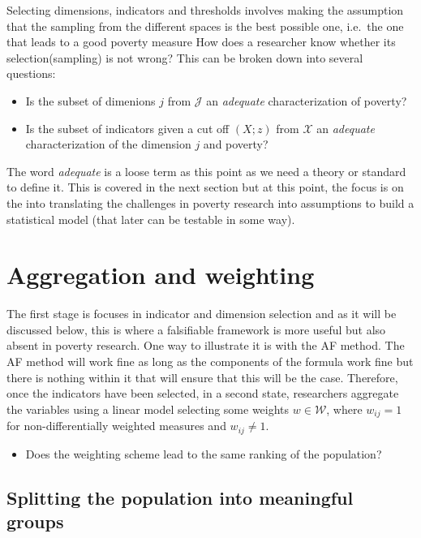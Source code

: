 \documentclass[]{book}
\providecommand{\tightlist}{%
  \setlength{\itemsep}{0pt}\setlength{\parskip}{0pt}}
\begin{document}
Selecting dimensions, indicators and thresholds involves making the assumption that the sampling from the different spaces is the best possible one, i.e.~the one that leads to a good poverty measure How does a researcher know whether its selection(sampling) is not wrong? This can be broken down into several questions:

\begin{itemize}
\tightlist
\item
  Is the subset of dimenions \(j\) from \(\mathscr J\) an \emph{adequate} characterization of poverty?
\item
  Is the subset of indicators given a cut off \((X;z)\) from \(\mathscr X\) an \emph{adequate} characterization of the dimension \(j\) and poverty?
\end{itemize}

The word \emph{adequate} is a loose term as this point as we need a theory or standard to define it. This is covered in the next section but at this point, the focus is on the into translating the challenges in poverty research into assumptions to build a statistical model (that later can be testable in some way).

\hypertarget{aggregation-and-weighting}{%
\section{Aggregation and weighting}\label{aggregation-and-weighting}}

The first stage is focuses in indicator and dimension selection and as it will be discussed below, this is where a falsifiable framework is more useful but also absent in poverty research. One way to illustrate it is with the AF method. The AF method will work fine as long as the components of the formula work fine but there is nothing within it that will ensure that this will be the case. Therefore, once the indicators have been selected, in a second state, researchers aggregate the variables using a linear model selecting some weights \(w \in \mathscr W\), where \(w_{ij}=1\) for non-differentially weighted measures and \(w_{ij}\ne 1\).

\begin{itemize}
\tightlist
\item
  Does the weighting scheme lead to the same ranking of the population?
\end{itemize}

\hypertarget{splitting-the-population-into-meaningful-groups}{%
\subsection{Splitting the population into meaningful groups}\label{splitting-the-population-into-meaningful-groups}}
\end{document}
